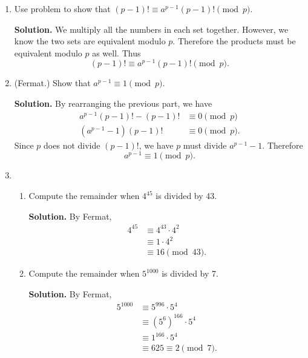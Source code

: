\documentclass[11pt]{article}
\theoremstyle{definition}
\begin{document}
\begin{enumerate} \addtocounter{enumi}{\value{problem_count}}

\item \addtocounter{problem_count}{1}
Use problem  to show that $(p-1)! \equiv a^{p-1}(p-1)! \pmod{p}$.

\textbf{Solution.}
We multiply all the numbers in each set together. However, we know the two sets are equivalent modulo $p$. Therefore the products must be equivalent modulo $p$ as well. Thus
\[(p - 1)! \equiv a^{p - 1}(p - 1)! \pmod{p}.\]

\item \addtocounter{problem_count}{1}
(Fermat.) Show that $a^{p-1} \equiv 1 \pmod{p}$.

\textbf{Solution.}
By rearranging the previous part, we have
\begin{align*}
a^{p - 1}(p - 1)! - (p - 1)! &\equiv 0 \pmod{p} \\
(a^{p - 1} - 1)(p - 1)! &\equiv 0 \pmod{p}.
\end{align*}
Since $p$ does not divide $(p - 1)!$, we have $p$ must divide $a ^{p - 1} - 1$. Therefore
\[a^{p-1} \equiv 1 \pmod{p}.\]

\item \addtocounter{problem_count}{1}
\begin{enumerate}
\item 
Compute the remainder when $4^{45}$ is divided by 43.

\textbf{Solution.}
By Fermat,
\begin{align*}
4^{45} &\equiv 4^{43} \cdot 4^2 \\
&\equiv 1 \cdot 4^2 \\
&\equiv 16  \pmod{43}.
\end{align*}

\item  
Compute the remainder when $5^{1000}$ is divided by 7.

\textbf{Solution.}
By Fermat,
\begin{align*}
5^{1000} &\equiv 5^{996} \cdot 5^4 \\
&\equiv (5^6)^{166} \cdot 5^4 \\
&\equiv 1^{166} \cdot 5^4 \\
&\equiv 625 \equiv 2\pmod{7}.
\end{align*}

\end{enumerate}
\end{enumerate}
\end{document}
